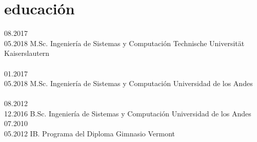 \documentclass[espanol]{cv-style}          %
\begin{document}

\section{educación}

\begin{entrylist}
\entry
{08.2017\\05.2018}
{M.Sc. {\normalfont Ingeniería de Sistemas y Computación}}
{Technische Universität Kaiserslautern}
{\\
\\
{\vspace{-0.2cm}}}
\entry
{01.2017\\05.2018}
{M.Sc. {\normalfont Ingeniería de Sistemas y Computación}}
{Universidad de los Andes}
{\\
\normalfont{[GPA 4.30]}\\
{\vspace{-0.2cm}}}
\entry
{08.2012\\12.2016}
{B.Sc. {\normalfont Ingeniería de Sistemas y Computación }}
{Universidad de los Andes}
{\normalfont{[GPA 4.08]}\\
{\vspace{-0.2cm}}}
\entry
{07.2010\\05.2012}
{IB. {\normalfont Programa del Diploma}}
{Gimnasio Vermont}
{\normalfont{[Puntaje IB 27]} \\
{\vspace{-0.5cm}}}
\end{entrylist}

\end{document}
